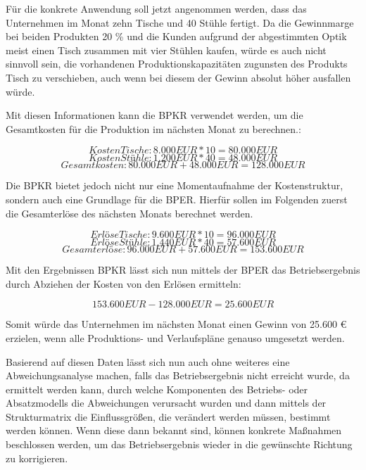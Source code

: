 Für die konkrete Anwendung soll jetzt angenommen werden, dass das Unternehmen im Monat zehn Tische und 40 Stühle fertigt. Da die Gewinnmarge bei beiden Produkten 20 \% und die Kunden aufgrund der abgestimmten Optik meist einen Tisch zusammen mit vier Stühlen kaufen, würde es auch nicht sinnvoll sein, die vorhandenen Produktionskapazitäten zugunsten des Produkts Tisch zu verschieben, auch wenn bei diesem der Gewinn absolut höher ausfallen würde.

Mit diesen Informationen kann die BPKR verwendet werden, um die Gesamtkosten für die Produktion im nächsten Monat zu berechnen.:

\[ Kosten Tische: 8.000 EUR * 10 = 80.000 EUR \]
\[ Kosten Stühle: 1.200 EUR * 40 = 48.000 EUR \]
\[ Gesamtkosten: 80.000 EUR + 48.000 EUR = 128.000 EUR \]

Die BPKR bietet jedoch nicht nur eine Momentaufnahme der Kostenstruktur, sondern auch eine Grundlage für die BPER. Hierfür sollen im Folgenden zuerst die Gesamterlöse des nächsten Monats berechnet werden.

\[ Erlöse Tische: 9.600 EUR * 10 = 96.000 EUR \]
\[ Erlöse Stühle: 1.440 EUR * 40 = 57.600 EUR \]
\[ Gesamterlöse: 96.000 EUR + 57.600 EUR = 153.600 EUR \]

Mit den Ergebnissen BPKR lässt sich nun mittels der BPER das Betriebsergebnis durch Abziehen der Kosten von den Erlösen ermitteln:

\[ 153.600 EUR - 128.000 EUR = 25.600 EUR \]

Somit würde das Unternehmen im nächsten Monat einen Gewinn von 25.600 {\euro} erzielen, wenn alle Produktions- und Verlaufspläne genauso umgesetzt werden.

Basierend auf diesen Daten lässt sich nun auch ohne weiteres eine Abweichungsanalyse machen, falls das Betriebsergebnis nicht erreicht wurde, da ermittelt werden kann, durch welche Komponenten des Betriebs- oder Absatzmodells die Abweichungen verursacht wurden und dann mittels der Strukturmatrix die Einflussgrößen, die verändert werden müssen, bestimmt werden können. Wenn diese dann bekannt sind, können konkrete Maßnahmen beschlossen werden, um das Betriebsergebnis wieder in die gewünschte Richtung zu korrigieren.